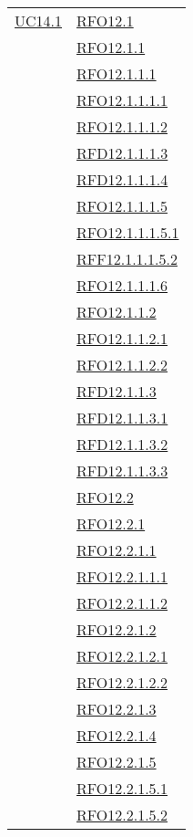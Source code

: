 \begin{longtable}{|>{\centering}m{5cm}|m{5cm}<{\centering}|}
\hyperlink{UC14.1}{UC14.1}
& \hyperlink{RFO12.1}{RFO12.1}\\
& \hyperlink{RFO12.1.1}{RFO12.1.1}\\
& \hyperlink{RFO12.1.1.1}{RFO12.1.1.1}\\
& \hyperlink{RFO12.1.1.1.1}{RFO12.1.1.1.1}\\
& \hyperlink{RFO12.1.1.1.2}{RFO12.1.1.1.2}\\
& \hyperlink{RFD12.1.1.1.3}{RFD12.1.1.1.3}\\
& \hyperlink{RFD12.1.1.1.4}{RFD12.1.1.1.4}\\
& \hyperlink{RFO12.1.1.1.5}{RFO12.1.1.1.5}\\
& \hyperlink{RFO12.1.1.1.5.1}{RFO12.1.1.1.5.1}\\
& \hyperlink{RFF12.1.1.1.5.2}{RFF12.1.1.1.5.2}\\
& \hyperlink{RFO12.1.1.1.6}{RFO12.1.1.1.6}\\
& \hyperlink{RFO12.1.1.2}{RFO12.1.1.2}\\
& \hyperlink{RFO12.1.1.2.1}{RFO12.1.1.2.1}\\
& \hyperlink{RFO12.1.1.2.2}{RFO12.1.1.2.2}\\
& \hyperlink{RFD12.1.1.3}{RFD12.1.1.3}\\
& \hyperlink{RFD12.1.1.3.1}{RFD12.1.1.3.1}\\
& \hyperlink{RFD12.1.1.3.2}{RFD12.1.1.3.2}\\
& \hyperlink{RFD12.1.1.3.3}{RFD12.1.1.3.3}\\
& \hyperlink{RFO12.2}{RFO12.2}\\
& \hyperlink{RFO12.2.1}{RFO12.2.1}\\
& \hyperlink{RFO12.2.1.1}{RFO12.2.1.1}\\
& \hyperlink{RFO12.2.1.1.1}{RFO12.2.1.1.1}\\
& \hyperlink{RFO12.2.1.1.2}{RFO12.2.1.1.2}\\
& \hyperlink{RFO12.2.1.2}{RFO12.2.1.2}\\
& \hyperlink{RFO12.2.1.2.1}{RFO12.2.1.2.1}\\
& \hyperlink{RFO12.2.1.2.2}{RFO12.2.1.2.2}\\
& \hyperlink{RFO12.2.1.3}{RFO12.2.1.3}\\
& \hyperlink{RFO12.2.1.4}{RFO12.2.1.4}\\
& \hyperlink{RFO12.2.1.5}{RFO12.2.1.5}\\
& \hyperlink{RFO12.2.1.5.1}{RFO12.2.1.5.1}\\
& \hyperlink{RFO12.2.1.5.2}{RFO12.2.1.5.2}\\\hline


\end{longtable}

